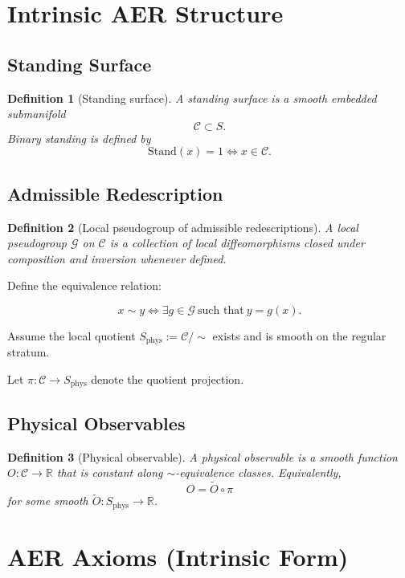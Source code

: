 \documentclass[11pt]{article}
\newtheorem{definition}{Definition}[section]
\theoremstyle{remark}
\theoremstyle{plain}
\begin{document}
\section{Intrinsic AER Structure}

\subsection{Standing Surface}

\begin{definition}[Standing surface]
A standing surface is a smooth embedded submanifold
\[
\mathcal{C}\subset S.
\]
Binary standing is defined by
\[
\mathrm{Stand}(x)=1 \iff x\in\mathcal{C}.
\]
\end{definition}

\subsection{Admissible Redescription}

\begin{definition}[Local pseudogroup of admissible redescriptions]
A local pseudogroup $\mathcal{G}$ on $\mathcal{C}$ is a collection of local diffeomorphisms
closed under composition and inversion whenever defined.
\end{definition}

Define the equivalence relation:

\[
x\sim y \iff \exists g\in\mathcal{G}\ \text{such that}\ y=g(x).
\]

Assume the local quotient $S_{\mathrm{phys}}:=\mathcal{C}/\sim$ exists and is smooth on the regular stratum.

Let $\pi:\mathcal{C}\to S_{\mathrm{phys}}$ denote the quotient projection.

\subsection{Physical Observables}

\begin{definition}[Physical observable]
A physical observable is a smooth function $O:\mathcal{C}\to\mathbb{R}$
that is constant along $\sim$-equivalence classes.
Equivalently,
\[
O=\tilde O\circ \pi
\]
for some smooth $\tilde O:S_{\mathrm{phys}}\to\mathbb{R}$.
\end{definition}

\section{AER Axioms (Intrinsic Form)}
\end{document}
